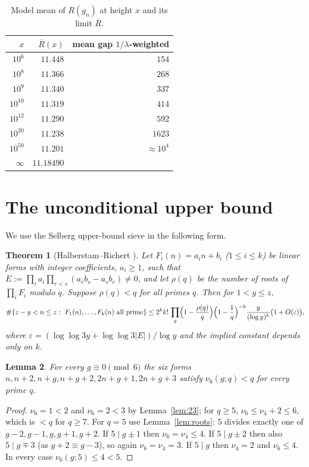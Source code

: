 \documentclass[11pt,a4paper]{article}
\theoremstyle{plain}
\newtheorem{theorem}{Theorem}[section]
\newtheorem{lemma}[theorem]{Lemma}
\theoremstyle{definition}
\theoremstyle{remark}
\newcommand{\Rbar}{\overline{R}}
\begin{document}
\begin{table}[h]\centering
\begin{tabular}{@{}rrr@{}}\toprule
$x$ & $\Rbar(x)$ & mean gap $1/\lambda$-weighted\\ \midrule
$10^{6}$ & $11.448$ & $154$\\
$10^{8}$ & $11.366$ & $268$\\
$10^{9}$ & $11.340$ & $337$\\
$10^{10}$ & $11.319$ & $414$\\
$10^{12}$ & $11.290$ & $592$\\
$10^{20}$ & $11.238$ & $1623$\\
$10^{50}$ & $11.201$ & $\approx10^4$\\
$\infty$ & $11.18490$ & \\ \bottomrule
\end{tabular}
\caption{Model mean of $R(g_n)$ at height $x$ and its limit $\Rbar$.}\label{tab:Rx}
\end{table}

\section{The unconditional upper bound}

We use the Selberg upper-bound sieve in the following form.

\begin{theorem}[Halberstam--Richert {\cite[Thm.~5.7]{HR}}]\label{thm:HR}
Let $F_i(n)=a_in+b_i$ ($1\le i\le k$) be linear forms with integer
coefficients, $a_i\ge1$, such that
$E:=\prod_ia_i\prod_{r<s}(a_rb_s-a_sb_r)\neq0$, and let $\rho(q)$ be the
number of roots of $\prod_iF_i$ modulo $q$.  Suppose $\rho(q)<q$ for all
primes $q$.  Then for $1<y\le z$,
\[
\#\{z-y<n\le z:\ F_1(n),\dots,F_k(n)\text{ all prime}\}
\le 2^kk!\,\prod_q\Bigl(1-\frac{\rho(q)}q\Bigr)\Bigl(1-\frac1q\Bigr)^{-k}\frac{y}{(\log y)^k}
\bigl(1+O(\varepsilon)\bigr),
\]
where $\varepsilon=(\log\log3y+\log\log3|E|)/\log y$ and the implied
constant depends only on $k$.
\end{theorem}

\begin{lemma}\label{lem:adm6}
For every $g\equiv0\pmod6$ the six forms $n,n+2,n+g,n+g+2,2n+g+1,2n+g+3$
satisfy $\nu_6(g;q)<q$ for every prime $q$.
\end{lemma}
\begin{proof}
$\nu_6=1<2$ and $\nu_6=2<3$ by Lemma~\ref{lem:23}; for $q\ge5$,
$\nu_6\le\nu_4+2\le6$, which is $<q$ for $q\ge7$.  For $q=5$ use
Lemma~\ref{lem:roots}: $5$ divides exactly one of $g-2,g-1,g,g+1,g+2$.
If $5\mid g\pm1$ then $\nu_6=\nu_4\le4$.  If $5\mid g\pm2$ then also
$5\mid g\mp3$ (as $g+2\equiv g-3$), so again $\nu_6=\nu_4=3$.  If $5\mid g$
then $\nu_4=2$ and $\nu_6\le4$.  In every case $\nu_6(g;5)\le4<5$.
\end{proof}
\end{document}
